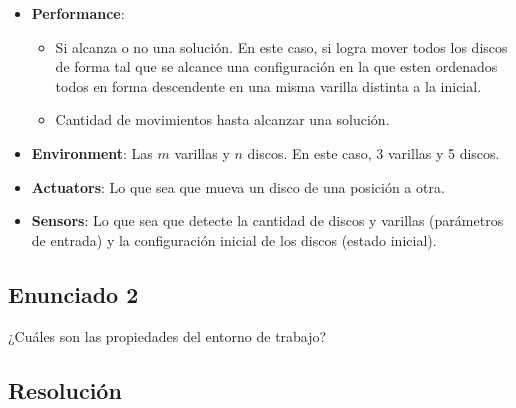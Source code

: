 \documentclass[12pt]{article}
\begin{document}
            \begin{itemize}
                \item \textbf{Performance}:
                    \begin{itemize}
                        \item Si alcanza o no una solución. En este caso, si logra mover todos los discos de forma tal que se alcance una configuración en la que esten ordenados todos en forma descendente en una misma varilla distinta a la inicial.
                        \item Cantidad de movimientos hasta alcanzar una solución.
                    \end{itemize}
                \item \textbf{Environment}: Las $m$ varillas y $n$ discos. En este caso, 3 varillas y 5 discos.
                \item \textbf{Actuators}: Lo que sea que mueva un disco de una posición a otra.
                \item \textbf{Sensors}: Lo que sea que detecte la cantidad de discos y varillas (parámetros de entrada) y la configuración inicial de los discos (estado inicial).
            \end{itemize}
            
    \newpage

%

    \subsection*{Enunciado 2}
        
        ¿Cuáles son las propiedades del entorno de trabajo?
        \subsection*{Resolución}
            \vspace{0.1in}
\end{document}
